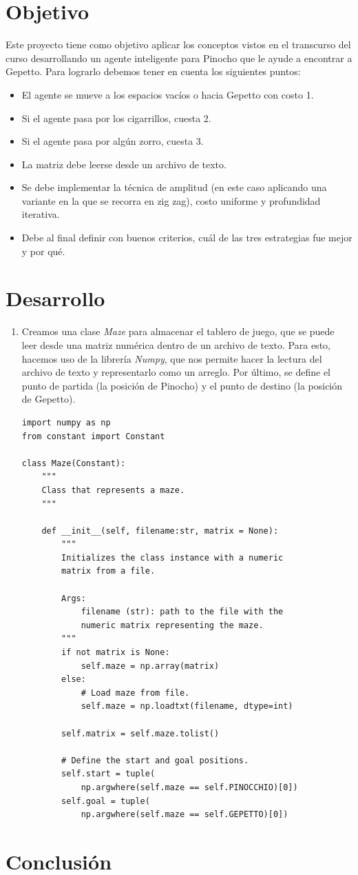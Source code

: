 \documentclass[12pt]{article}
\begin{document}
\section{Objetivo}
Este proyecto tiene como objetivo aplicar los conceptos vistos en el transcurso del curso desarrollando un agente inteligente para Pinocho que le ayude a encontrar a Gepetto. Para lograrlo debemos tener en cuenta los siguientes puntos:
\begin{itemize}
    \item El agente se mueve a los espacios vacíos o hacia Gepetto con costo 1.
    \item Si el agente pasa por los cigarrillos, cuesta 2.
    \item Si el agente pasa por algún zorro, cuesta 3.
    \item La matriz debe leerse desde un archivo de texto.
    \item Se debe implementar la técnica de amplitud (en este caso aplicando una variante en la que se recorra en zig zag), costo uniforme y profundidad iterativa.
    \item Debe al final definir con buenos criterios, cuál de las tres estrategias fue mejor y por qué.
\end{itemize}
\clearpage
\section{Desarrollo}
\begin{enumerate}
    \item Creamos una clase \textit{Maze} para almacenar el tablero de juego, que se puede leer desde una matriz numérica dentro de un archivo de texto. Para esto, hacemos uso de la librería \textit{Numpy}, que nos permite hacer la lectura del archivo de texto y representarlo como un arreglo. Por último, se define el punto de partida (la posición de Pinocho) y el punto de destino (la posición de Gepetto).\\
\begin{lstlisting}[style=pythonstyle]
import numpy as np
from constant import Constant

class Maze(Constant):
    """
    Class that represents a maze.
    """

    def __init__(self, filename:str, matrix = None):
        """
        Initializes the class instance with a numeric
        matrix from a file.

        Args:
            filename (str): path to the file with the
            numeric matrix representing the maze.
        """
        if not matrix is None:
            self.maze = np.array(matrix)
        else:
            # Load maze from file.
            self.maze = np.loadtxt(filename, dtype=int)
            
        self.matrix = self.maze.tolist()

        # Define the start and goal positions.
        self.start = tuple(
            np.argwhere(self.maze == self.PINOCCHIO)[0])
        self.goal = tuple(
            np.argwhere(self.maze == self.GEPETTO)[0])
\end{lstlisting}
\end{enumerate}
\clearpage
\section{Conclusión}
\clearpage
\end{document}
